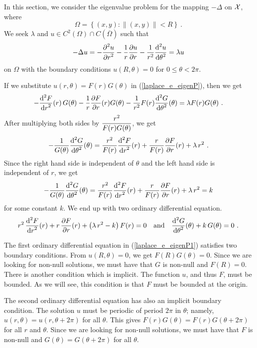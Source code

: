 In this section, we consider the eigenvalue problem for the mapping
$-\Delta$ on $\cal X$, where
\[
  \Omega = \left\{ (x,y) :  \|(x,y)\| < R \right\} \ .
\]
We seek $\lambda$ and
$u \in C^2(\Omega)\cap C(\overline{\Omega})$ such that
\begin{equation} \label{laplace_e_eigenP}
-\Delta u = -\frac{\displaystyle \partial^{2}{u}} {\displaystyle \partial r^{2}} - \frac{1}{r} \frac{\partial{u}}{\partial r}
- \frac{1}{r^2} \frac{\displaystyle \mathrm{d}^{2}{u}} {\displaystyle \mathrm{d}{\theta}^{2}} = \lambda u
\end{equation}
on $\Omega$ with the boundary conditions $u(R,\theta) =0$ for
$0\leq \theta < 2\pi$.

If we substitute $u(r,\theta) = F(r)G(\theta)$ in
(\ref{laplace_e_eigenP}), then we get
\[
-\frac{\displaystyle \mathrm{d}^{2}{F}} {\displaystyle \mathrm{d}{r}^{2}}(r)\, G(\theta) - \frac{1}{r} \frac{\partial{F}}{\partial r}(r) G(\theta)
- \frac{1}{r^2} F(r)\frac{\displaystyle \mathrm{d}^{2}{G}} {\displaystyle \mathrm{d}{\theta}^{2}}(\theta) = \lambda F(r)G(\theta) \ .
\]
After multiplying both sides by
$\displaystyle \frac{r^2}{F(r)G(\theta)}$, we get
\[
-\frac{1}{G(\theta)} \frac{\displaystyle \mathrm{d}^{2}{G}} {\displaystyle \mathrm{d}{\theta}^{2}}(\theta) =
\frac{r^2}{F(r)} \frac{\displaystyle \mathrm{d}^{2}{F}} {\displaystyle \mathrm{d}{r}^{2}}(r) + \frac{r}{F(r)} \frac{\partial{F}}{\partial r}(r)
+ \lambda \, r^2 \ .
\]
Since the right hand side is independent of $\theta$ and the left hand side
is independent of $r$, we get
\[
-\frac{1}{G(\theta)} \frac{\displaystyle \mathrm{d}^{2}{G}} {\displaystyle \mathrm{d}{\theta}^{2}}(\theta) =
\frac{r^2}{F(r)} \frac{\displaystyle \mathrm{d}^{2}{F}} {\displaystyle \mathrm{d}{r}^{2}}(r) + \frac{r}{F(r)} \frac{\partial{F}}{\partial r}(r)
+ \lambda \, r^2 = k
\]
for some constant $k$.  We end up with two ordinary differential equation.
\begin{equation} \label{laplace_e_eigenP1}
r^2\,\frac{\displaystyle \mathrm{d}^{2}{F}} {\displaystyle \mathrm{d}{r}^{2}}(r) + r\, \frac{\partial{F}}{\partial r}(r)
+ \left(\lambda \, r^2 -k\right) F(r) = 0 \quad \text{and} \quad
\frac{\displaystyle \mathrm{d}^{2}{G}} {\displaystyle \mathrm{d}{\theta}^{2}}(\theta) + k\,G(\theta) = 0 \  .
\end{equation}

The first ordinary differential equation in
(\ref{laplace_e_eigenP1}) satisfies two boundary
conditions.   From $u(R,\theta) = 0$, we get $F(R)G(\theta)=0$.  Since
we are looking for non-null solutions, we must have that $G$ is
non-null and $F(R)=0$.  There is another condition which is
implicit.  The function $u$, and thus $F$, must be bounded.  As we
will see, this condition is that $F$ must be bounded at the origin.

The second ordinary differential equation has also an implicit
boundary condition.  The solution
$u$ must be periodic of period $2\pi$ in $\theta$; namely,
$u(r,\theta) = u(r,\theta + 2\pi)$ for all $\theta$.  This gives
$F(r)G(\theta) = F(r)G(\theta + 2\pi)$ for all $r$ and $\theta$.
Since we are looking for non-null solutions, we must have that
$F$ is non-null and $G(\theta) = G(\theta + 2\pi)$ for all
$\theta$.

